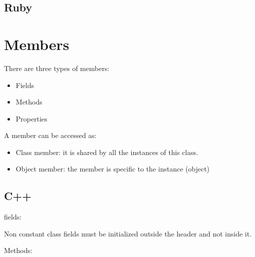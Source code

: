 \documentclass{KodeBook}
\begin{document}





\subsection{Ruby}







\section{Members}

There are three types of members: 
\begin{itemize}
	\item Fields
	\item Methods
	\item Properties
\end{itemize}

A member can be accessed as: 
\begin{itemize}
	\item Class member: it is shared by all the instances of this class.
	\item Object member: the member is specific to the instance (object)
\end{itemize}


\subsection{C++}

fields: 


Non constant class fields must be initialized outside the header and not inside it. 

 

Methods:



\end{document}
